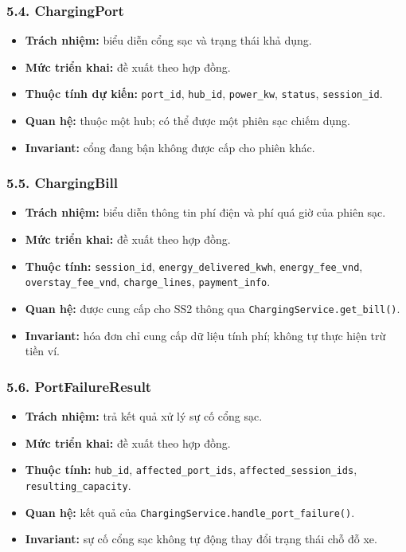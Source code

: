 \documentclass[11pt,a4paper]{article}
\providecommand{\tightlist}{%
  \setlength{\itemsep}{0pt}\setlength{\parskip}{0pt}}
\begin{document}
\hypertarget{chargingport}{%
\subsubsection{5.4. ChargingPort}\label{chargingport}}

\begin{itemize}
\tightlist
\item
  \textbf{Trách nhiệm:} biểu diễn cổng sạc và trạng thái khả dụng.
\item
  \textbf{Mức triển khai:} đề xuất theo hợp đồng.
\item
  \textbf{Thuộc tính dự kiến:} \texttt{port\_id}, \texttt{hub\_id},
  \texttt{power\_kw}, \texttt{status}, \texttt{session\_id}.
\item
  \textbf{Quan hệ:} thuộc một hub; có thể được một phiên sạc chiếm dụng.
\item
  \textbf{Invariant:} cổng đang bận không được cấp cho phiên khác.
\end{itemize}

\hypertarget{chargingbill}{%
\subsubsection{5.5. ChargingBill}\label{chargingbill}}

\begin{itemize}
\tightlist
\item
  \textbf{Trách nhiệm:} biểu diễn thông tin phí điện và phí quá giờ của
  phiên sạc.
\item
  \textbf{Mức triển khai:} đề xuất theo hợp đồng.
\item
  \textbf{Thuộc tính:} \texttt{session\_id},
  \texttt{energy\_delivered\_kwh}, \texttt{energy\_fee\_vnd},
  \texttt{overstay\_fee\_vnd}, \texttt{charge\_lines},
  \texttt{payment\_info}.
\item
  \textbf{Quan hệ:} được cung cấp cho SS2 thông qua
  \texttt{ChargingService.get\_bill()}.
\item
  \textbf{Invariant:} hóa đơn chỉ cung cấp dữ liệu tính phí; không tự
  thực hiện trừ tiền ví.
\end{itemize}

\hypertarget{portfailureresult}{%
\subsubsection{5.6. PortFailureResult}\label{portfailureresult}}

\begin{itemize}
\tightlist
\item
  \textbf{Trách nhiệm:} trả kết quả xử lý sự cố cổng sạc.
\item
  \textbf{Mức triển khai:} đề xuất theo hợp đồng.
\item
  \textbf{Thuộc tính:} \texttt{hub\_id}, \texttt{affected\_port\_ids},
  \texttt{affected\_session\_ids}, \texttt{resulting\_capacity}.
\item
  \textbf{Quan hệ:} kết quả của
  \texttt{ChargingService.handle\_port\_failure()}.
\item
  \textbf{Invariant:} sự cố cổng sạc không tự động thay đổi trạng thái
  chỗ đỗ xe.
\end{itemize}
\end{document}
